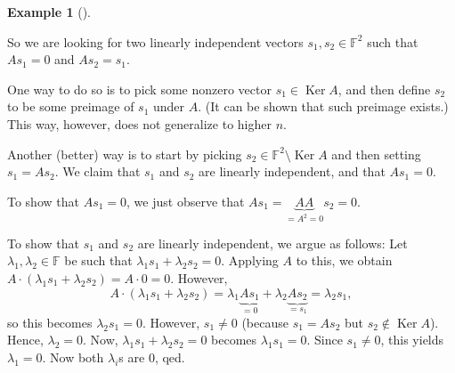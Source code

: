 \documentclass[numbers=enddot,12pt,final,onecolumn,notitlepage]{scrartcl}%
\numberwithin{exer}{subsection}
\theoremstyle{definition}
\newtheorem{exam}[theo]{Example}
\newenvironment{example}[1][]
{\begin{exam}[#1]\begin{leftbar}}
{\end{leftbar}\end{exam}}
\begin{document}
\begin{example}
So we are looking for two linearly independent vectors $s_{1},s_{2}%
\in\mathbb{F}^{2}$ such that $As_{1}=0$ and $As_{2}=s_{1}$.

One way to do so is to pick some nonzero vector $s_{1}\in\operatorname*{Ker}%
A$, and then define $s_{2}$ to be some preimage of $s_{1}$ under $A$. (It can
be shown that such preimage exists.) This way, however, does not generalize to
higher $n$.

Another (better) way is to start by picking $s_{2}\in\mathbb{F}^{2}%
\setminus\operatorname*{Ker}A$ and then setting $s_{1}=As_{2}$. We claim that
$s_{1}$ and $s_{2}$ are linearly independent, and that $As_{1}=0$.

To show that $As_{1}=0$, we just observe that $As_{1}=\underbrace{AA}%
_{=A^{2}=0}s_{2}=0$.

To show that $s_{1}$ and $s_{2}$ are linearly independent, we argue as
follows: Let $\lambda_{1},\lambda_{2}\in\mathbb{F}$ be such that $\lambda
_{1}s_{1}+\lambda_{2}s_{2}=0$. Applying $A$ to this, we obtain $A\cdot\left(
\lambda_{1}s_{1}+\lambda_{2}s_{2}\right)  =A\cdot0=0$. However,%
\[
A\cdot\left(  \lambda_{1}s_{1}+\lambda_{2}s_{2}\right)  =\lambda
_{1}\underbrace{As_{1}}_{=0}+\lambda_{2}\underbrace{As_{2}}_{=s_{1}}%
=\lambda_{2}s_{1},
\]
so this becomes $\lambda_{2}s_{1}=0$. However, $s_{1}\neq0$ (because
$s_{1}=As_{2}$ but $s_{2}\notin\operatorname*{Ker}A$). Hence, $\lambda_{2}=0$.
Now, $\lambda_{1}s_{1}+\lambda_{2}s_{2}=0$ becomes $\lambda_{1}s_{1}=0$. Since
$s_{1}\neq0$, this yields $\lambda_{1}=0$. Now both $\lambda_{i}$s are $0$, qed.
\end{example}
\end{document}
